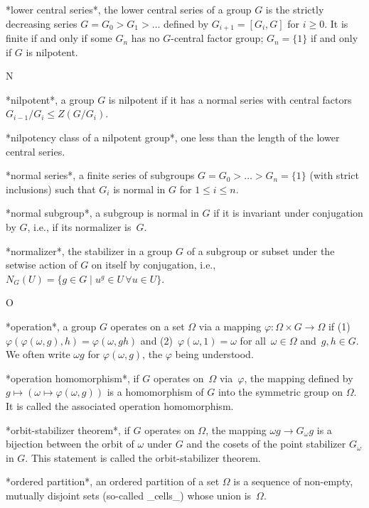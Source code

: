 *lower central  series*, the lower central  series of a  group $G$ is the
strictly decreasing series $G = G_0 > G_1 > \ldots$ defined by $G_{i+1} =
[G_i,G]$ for $i\ge  0$. It is  finite if and  only if  some  $G_n$ has no
$G$-central factor group; $G_n=\{1\}$ if and only if $G$ is nilpotent.

 N

*nilpotent*, a group $G$   is nilpotent if it   has a normal series  with
central factors $G_{i-1}/G_i \le Z(G/G_i)$.

*nilpotency class of a nilpotent group*, one  less than the length of the
lower central series.

*normal series*, a finite series of  subgroups $G = G_0 >  \ldots > G_n =
\{1\}$  (with  strict inclusions) such that   $G_i$ is normal  in $G$ for
$1\leq i\leq n$.

*normal subgroup*, a subgroup is normal  in $G$ if  it is invariant under
conjugation by $G$, i.e., if its normalizer is~$G$.

*normalizer*, the stabilizer in a group $G$ of a subgroup or subset under
the setwise action   of $G$ on  itself by  conjugation,  i.e., $N_G(U)  =
\{g\in G\mid u^g\in U\,\forall u\in U\}$.

 O

*operation*,   a group $G$  operates on   a  set $\Omega$  via a  mapping
$\varphi\colon         \Omega\times            G\to     \Omega$        if
(1)~$\varphi(\varphi(\omega,g),h)      =      \varphi(\omega,gh)$     and
(2)~$\varphi(\omega,1)=\omega$ for all~$\omega\in \Omega$ and~$g,h\in G$.
We  often write $\omega g$  for  $\varphi(\omega,g)$, the $\varphi$ being
understood.

*operation homomorphism*, if  $G$ operates on~$\Omega$ via~$\varphi$, the
mapping defined by $g  \mapsto  (\omega \mapsto \varphi(\omega,g))$  is a
homomorphism of $G$  into the symmetric group on  $\Omega$. It  is called
the associated operation homomorphism.

*orbit-stabilizer theorem*,  if   $G$ operates on  $\Omega$,  the mapping
$\omega  g \to G_\omega  g$ is a  bijection between the orbit of $\omega$
under $G$ and the cosets of the point stabilizer  $G_\omega$ in $G$. This
statement is called the orbit-stabilizer theorem.

*ordered partition*, an ordered partition of a set $\Omega$ is a sequence
of   non-empty, mutually disjoint  sets  (so-called  _cells_) whose union
is~$\Omega$.

